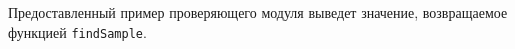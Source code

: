 Предоставленный пример проверяющего модуля выведет значение, возвращаемое функцией
\texttt{findSample}.